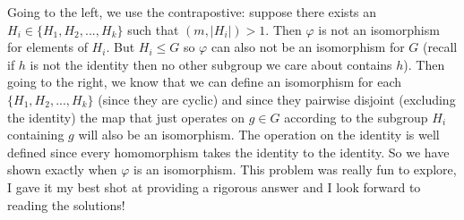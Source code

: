 \documentclass[11pt]{article}
\begin{document}
\begin{exercise}{74}{13}
{        Going to the left, we use the contrapostive: suppose there exists an $H_i \in \{ H_1, H_2, ..., H_k \}$ such that $(m, |H_i|) > 1$.
        Then $\varphi$ is not an isomorphism for elements of $H_i$.
        But $H_i \leq G$ so $\varphi$ can also not be an isomorphism for $G$ (recall if $h$ is not the identity then no other subgroup we care about contains $h$). \parspace 
        Then going to the right, we know that we can define an isomorphism for each $\{ H_1, H_2, ..., H_k \}$ (since they are cyclic) and since they pairwise disjoint (excluding the identity) the map that just operates on $g \in G$ according to the subgroup $H_i$ containing $g$ will also be an isomorphism.
        The operation on the identity is well defined since every homomorphism takes the identity to the identity. 
        So we have shown exactly when $\varphi$ is an isomorphism. \parspace 
        This problem was really fun to explore, I gave it my best shot at providing a rigorous answer and I look forward to reading the solutions!
    }
\end{exercise}


\end{document}
